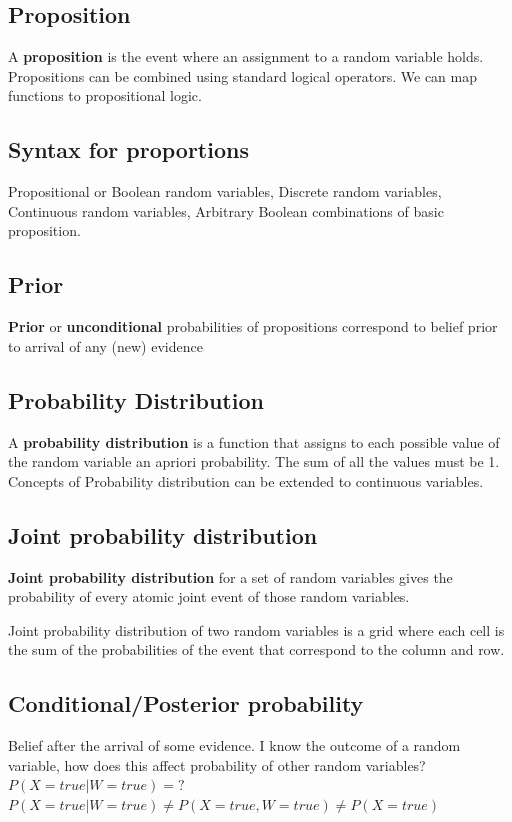 \subsection{Proposition}
A \textbf{proposition} is the event where an assignment to a random variable holds. Propositions can be combined using standard logical operators.
We can map functions to propositional logic.
\subsection{Syntax for proportions}
Propositional or Boolean random variables, Discrete random variables, Continuous random variables, Arbitrary Boolean combinations of basic proposition.
\subsection{Prior}
\textbf{Prior} or \textbf{unconditional} probabilities of propositions correspond to belief prior to arrival of any (new) evidence

\subsection{Probability Distribution}
A \textbf{probability distribution} is a function that assigns to each possible value of the random variable an apriori probability. The sum of all the values must be 1. Concepts of Probability distribution can be extended to continuous variables.

\subsection{Joint probability distribution}
\textbf{Joint probability distribution} for a set of random variables gives the probability of every atomic joint event of those random variables.

Joint probability distribution of two random variables is a grid where each cell is the sum of the probabilities of the event that correspond to the column and row.

\subsection{Conditional/Posterior probability}
Belief after the arrival of some evidence. I know the outcome of a random variable, how does this affect probability of other random variables?\\
$P(X=true|W=true) = ?$ \\
$P(X=true|W=true) \neq P(X=true, W=true) \neq P(X=true)$ \\
